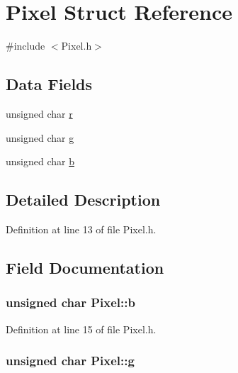 \hypertarget{structPixel}{}\section{Pixel Struct Reference}
\label{structPixel}


{\ttfamily \#include $<$Pixel.\+h$>$}

\subsection*{Data Fields}
\begin{DoxyCompactItemize}
\item 
unsigned char \hyperlink{structPixel_a038ad5b3349e7548d17c5d3bec511b94}{r}
\item 
unsigned char \hyperlink{structPixel_a8407845aacf1663d9463475619911686}{g}
\item 
unsigned char \hyperlink{structPixel_a760bdf29b15433d257f119239fcff4d4}{b}
\end{DoxyCompactItemize}


\subsection{Detailed Description}


Definition at line 13 of file Pixel.\+h.



\subsection{Field Documentation}
\hypertarget{structPixel_a760bdf29b15433d257f119239fcff4d4}{}
\subsubsection[{b}]{\setlength{\rightskip}{0pt plus 5cm}unsigned char Pixel\+::b}\label{structPixel_a760bdf29b15433d257f119239fcff4d4}


Definition at line 15 of file Pixel.\+h.

\hypertarget{structPixel_a8407845aacf1663d9463475619911686}{}
\subsubsection[{g}]{\setlength{\rightskip}{0pt plus 5cm}unsigned char Pixel\+::g}\label{structPixel_a8407845aacf1663d9463475619911686}


